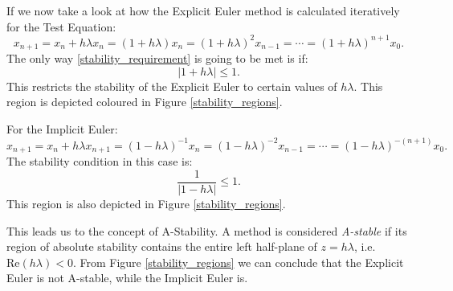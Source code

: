 If we now take a look at how the Explicit Euler method is calculated iteratively for the Test Equation:
\begin{equation*}
    x_{n + 1} = x_n + h\lambda x_n = (1+h\lambda) x_n = (1+h\lambda)^2 x_{n-1} = \cdots = (1+h\lambda)^{n+1} x_0.
\end{equation*}
The only way \ref{stability_requirement} is going to be met is if:
\begin{equation*}
    |1+h\lambda| \leq 1.
\end{equation*}
This restricts the stability of the Explicit Euler to certain values of $h\lambda$. This region is depicted coloured in Figure \ref{stability_regions}.

For the Implicit Euler:
\begin{equation*}
     x_{n + 1} = x_n + h\lambda x_{n+1} = (1-h\lambda)^{-1} x_n = (1-h\lambda)^{-2} x_{n-1} = \cdots = (1-h\lambda)^{-(n+1)} x_0.
\end{equation*}
The stability condition in this case is:
\begin{equation*}
    \frac{1}{|1-h\lambda|} \leq 1.
\end{equation*}
This region is also depicted in Figure \ref{stability_regions}.

This leads us to the concept of A-Stability. A method is considered \textit{A-stable} if its region of absolute stability contains the entire left half-plane of $z=h\lambda$, i.e. $\text{Re}(h\lambda) < 0$. From Figure \ref{stability_regions} we can conclude that the Explicit Euler is not A-stable, while the Implicit Euler is.


